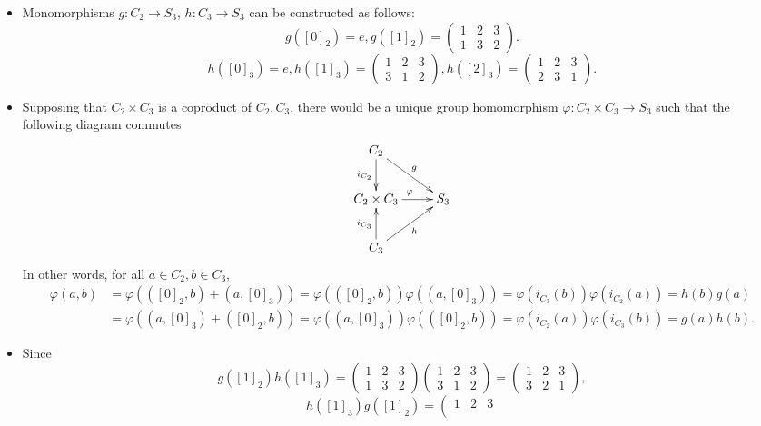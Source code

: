 \documentclass[12pt,letterpaper,boxed]{hmcpset}
\begin{document}
\begin{solution}
	\begin{itemize}
	\item 
	Monomorphisms $g:C_2\rightarrow S_3$, $h:C_3 \rightarrow S_3$ can be constructed as follows:
	\[
	g([0]_2)=e,g([1]_2)=\left(
	\begin{matrix}	
	1 & 2 & 3\\	
	1 & 3 & 2	
	\end{matrix}
	\right).
	\]
	\[
	h([0]_3)=e,h([1]_3)=\left(
	\begin{matrix}	
	1 & 2 & 3\\	
	3 & 1 & 2	
	\end{matrix}
	\right),h([2]_3)=\left(
	\begin{matrix}	
	1 & 2 & 3\\	
	2 & 3 & 1	
	\end{matrix}
	\right).
	\]
	\item Supposing that $C_2\times C_3$ is a coproduct of $C_2, C_3$, there would be a unique group homomorphism $\varphi :C_2\times C_3\rightarrow S_3$ such that the following diagram commutes
	\[\xymatrix{
		C_2\ar[rd]^{g}\ar[d]_{i_{C_2}}  \\
		C_2 \times C_3\ar[r]^{\varphi} &  S_3\\
		C_3\ar[ru]_{h}\ar[u]^{i_{C_3}}  
	}\]
    In other words, for all $a\in C_2,b\in C_3$,
    \[
    \begin{aligned}
    \varphi(a,b)&=\varphi(([0]_2,b)+(a,[0]_3))=\varphi(([0]_2,b))\varphi((a,[0]_3))=\varphi(i_{C_3}(b))\varphi(i_{C_2}(a))=h(b)g(a)\\
    &=\varphi((a,[0]_3)+([0]_2,b))=\varphi((a,[0]_3))\varphi(([0]_2,b))=\varphi(i_{C_2}(a))\varphi(i_{C_3}(b))=g(a)h(b).
    \end{aligned}
    \]
	\item Since
	\[
	g([1]_2)h([1]_3)=\left(
	\begin{matrix}	
	1 & 2 & 3\\	
	1 & 3 & 2	
	\end{matrix}
	\right)
	\left(
	\begin{matrix}	
	1 & 2 & 3\\	
	3 & 1 & 2	
	\end{matrix}
	\right)=
	\left(
	\begin{matrix}	
	1 & 2 & 3\\	
	3 & 2 & 1	
	\end{matrix}
	\right),
	\]
	\[
	h([1]_3)g([1]_2)=
	\left(
	\begin{matrix}	
	1 & 2 & 3\\	

\end{matrix}\]
\end{itemize}
\end{solution}
\end{document}
